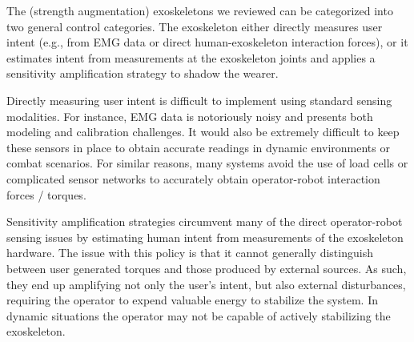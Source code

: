 \documentclass[letterpaper,12pt,fullpage]{article}
\begin{document}
The (strength augmentation) exoskeletons we reviewed can be categorized into two general control categories.  The exoskeleton either directly measures user intent (e.g., from EMG data or direct human-exoskeleton interaction forces), or it estimates intent from measurements at the exoskeleton joints and applies a sensitivity amplification strategy to shadow the wearer.  

Directly measuring user intent is difficult to implement using standard sensing modalities.  For instance, EMG data is notoriously noisy and presents both modeling and calibration challenges.  It would also be extremely difficult to keep these sensors in place to obtain accurate readings in dynamic environments or combat scenarios.  For similar reasons, many systems avoid the use of load cells or complicated sensor networks to accurately obtain operator-robot interaction forces / torques.  

Sensitivity amplification strategies circumvent many of the direct operator-robot sensing issues by estimating human intent from measurements of the exoskeleton hardware. The issue with this policy is that it cannot generally distinguish between user generated torques and those produced by external sources.  As such, they end up amplifying not only the user's intent, but also external disturbances, requiring the operator to expend valuable energy to stabilize the system.  
In dynamic situations the operator may not be capable of actively stabilizing the exoskeleton.
\end{document}

